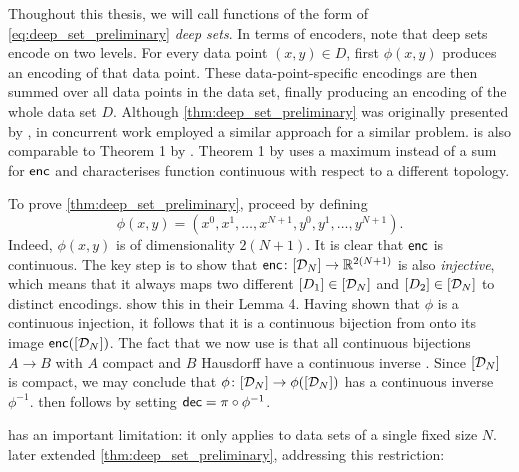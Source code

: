 \documentclass[12pt, twoside]{report}
\begin{document}
Thoughout this thesis, we will call functions of the form of \eqref{eq:deep_set_preliminary} \emph{deep sets}.
In terms of encoders, note that deep sets encode on two levels.
For every data point $(x, y) \in D$, first $\phi(x, y)$ produces an encoding of that data point.
These data-point-specific encodings are then summed over all data points in the data set, finally producing an encoding of the whole data set $D$.
Although \cref{thm:deep_set_preliminary} was originally presented by \textcite{Zaheer:2017:Deep_Sets}, in concurrent work \textcite{Edwards:2017:Towards_a_Neural_Statistician} employed a similar approach for a similar problem.
 is also comparable to Theorem 1 by \textcite{Qi:2017:PointNet_Deep_Learning_on_Point}.
Theorem 1 by \textcite{Qi:2017:PointNet_Deep_Learning_on_Point} uses a maximum instead of a sum for $\mathsf{enc}$ and characterises function continuous with respect to a different topology.

To prove \cref{thm:deep_set_preliminary}, \citeauthor{Zaheer:2017:Deep_Sets} proceed by defining
\begin{equation} \label{eq:power_series}
    \phi(x, y) =
    (
        x^0, x^1, \ldots, x^{N + 1},
        y^0, y^1, \ldots, y^{N + 1}
    ).
\end{equation}
Indeed, $\phi(x, y)$ is of dimensionality $2(N + 1)$.
It is clear that $\mathsf{enc}$ is continuous.
The key step is to show that $\mathsf{enc}\colon[\mathcal{D}_N] \to \mathbb{R}^{2(N+1)}$ is also \emph{injective}, which means that
it always maps two different $[D_1] \in [\mathcal{D}_N]$ and $[D_2] \in [\mathcal{D}_N]$ to distinct encodings.
\citeauthor{Zaheer:2017:Deep_Sets} show this in their Lemma 4.
Having shown that $\phi$ is a continuous injection, it follows that it is a continuous bijection from onto its image $\mathsf{enc}([\mathcal{D}_N])$.
The fact that we now use is that all continuous bijections $A \to B$ with $A$ compact and $B$ Hausdorff have a continuous inverse \parencite[Theorem 26.6;][]{Munkres:2000:Topology}. 
Since $[\mathcal{D}_N]$ is compact, we may conclude that $\phi\colon [\mathcal{D}_N] \to \phi([\mathcal{D}_N])$ has a continuous inverse $\phi^{-1}$.
 then follows by setting $\mathsf{dec} = \pi \circ \phi^{-1}$.

 has an important limitation: 
it only applies to data sets of a single fixed size $N$.
\citeauthor{Wagstaff:2019:On_the_Limitations_of_Representing} later extended \cref{thm:deep_set_preliminary}, addressing this restriction:
\end{document}
